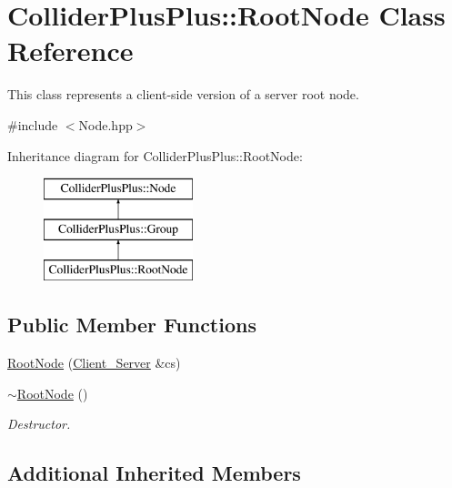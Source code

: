 \hypertarget{classColliderPlusPlus_1_1RootNode}{\section{Collider\-Plus\-Plus\-:\-:Root\-Node Class Reference}
\label{classColliderPlusPlus_1_1RootNode}
}


This class represents a client-\/side version of a server root node.  




{\ttfamily \#include $<$Node.\-hpp$>$}

Inheritance diagram for Collider\-Plus\-Plus\-:\-:Root\-Node\-:\begin{figure}[H]
\begin{center}
\leavevmode
\includegraphics[height=3.000000cm]{classColliderPlusPlus_1_1RootNode}
\end{center}
\end{figure}
\subsection*{Public Member Functions}
\begin{DoxyCompactItemize}
\item 
\hyperlink{classColliderPlusPlus_1_1RootNode_ab1a4476f355e19055fa056802e7ffee9}{Root\-Node} (\hyperlink{classColliderPlusPlus_1_1Client__Server}{Client\-\_\-\-Server} \&cs)
\item 
\hypertarget{classColliderPlusPlus_1_1RootNode_ae8b5552c4652ee2a5b9079124a1b7a76}{\hyperlink{classColliderPlusPlus_1_1RootNode_ae8b5552c4652ee2a5b9079124a1b7a76}{$\sim$\-Root\-Node} ()}\label{classColliderPlusPlus_1_1RootNode_ae8b5552c4652ee2a5b9079124a1b7a76}

\begin{DoxyCompactList}\small\item\em Destructor. \end{DoxyCompactList}\end{DoxyCompactItemize}
\subsection*{Additional Inherited Members}


